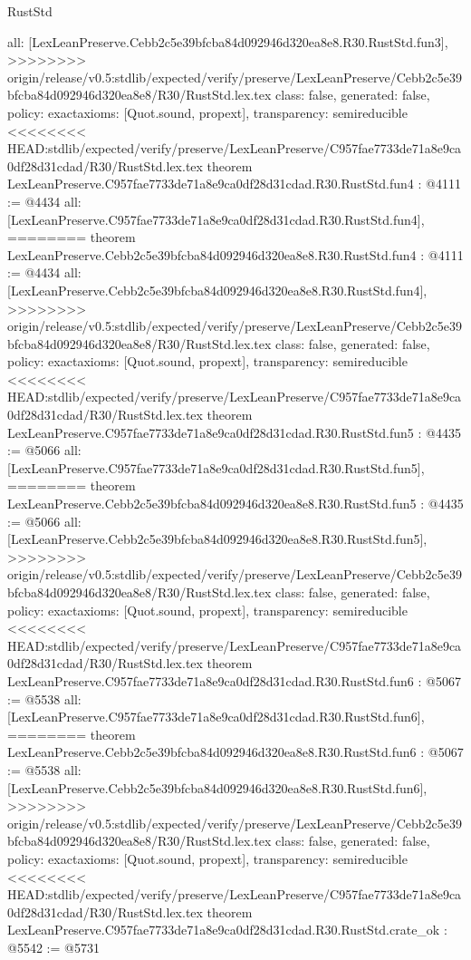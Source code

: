 \begin{lexlean}{RustStd}
\begin{coremodule}
{\begin{coremodule}
{{{{{{{  all: [LexLeanPreserve.Cebb2c5e39bfcba84d092946d320ea8e8.R30.RustStd.fun3],
>>>>>>>> origin/release/v0.5:stdlib/expected/verify/preserve/LexLeanPreserve/Cebb2c5e39bfcba84d092946d320ea8e8/R30/RustStd.lex.tex
  class: false,
  generated: false,
  policy: exact{axioms: [Quot.sound, propext]},
  transparency: semireducible
}
<<<<<<<< HEAD:stdlib/expected/verify/preserve/LexLeanPreserve/C957fae7733de71a8e9ca0df28d31cdad/R30/RustStd.lex.tex
theorem LexLeanPreserve.C957fae7733de71a8e9ca0df28d31cdad.R30.RustStd.fun4 : @4111 := @4434 {
  all: [LexLeanPreserve.C957fae7733de71a8e9ca0df28d31cdad.R30.RustStd.fun4],
========
theorem LexLeanPreserve.Cebb2c5e39bfcba84d092946d320ea8e8.R30.RustStd.fun4 : @4111 := @4434 {
  all: [LexLeanPreserve.Cebb2c5e39bfcba84d092946d320ea8e8.R30.RustStd.fun4],
>>>>>>>> origin/release/v0.5:stdlib/expected/verify/preserve/LexLeanPreserve/Cebb2c5e39bfcba84d092946d320ea8e8/R30/RustStd.lex.tex
  class: false,
  generated: false,
  policy: exact{axioms: [Quot.sound, propext]},
  transparency: semireducible
}
<<<<<<<< HEAD:stdlib/expected/verify/preserve/LexLeanPreserve/C957fae7733de71a8e9ca0df28d31cdad/R30/RustStd.lex.tex
theorem LexLeanPreserve.C957fae7733de71a8e9ca0df28d31cdad.R30.RustStd.fun5 : @4435 := @5066 {
  all: [LexLeanPreserve.C957fae7733de71a8e9ca0df28d31cdad.R30.RustStd.fun5],
========
theorem LexLeanPreserve.Cebb2c5e39bfcba84d092946d320ea8e8.R30.RustStd.fun5 : @4435 := @5066 {
  all: [LexLeanPreserve.Cebb2c5e39bfcba84d092946d320ea8e8.R30.RustStd.fun5],
>>>>>>>> origin/release/v0.5:stdlib/expected/verify/preserve/LexLeanPreserve/Cebb2c5e39bfcba84d092946d320ea8e8/R30/RustStd.lex.tex
  class: false,
  generated: false,
  policy: exact{axioms: [Quot.sound, propext]},
  transparency: semireducible
}
<<<<<<<< HEAD:stdlib/expected/verify/preserve/LexLeanPreserve/C957fae7733de71a8e9ca0df28d31cdad/R30/RustStd.lex.tex
theorem LexLeanPreserve.C957fae7733de71a8e9ca0df28d31cdad.R30.RustStd.fun6 : @5067 := @5538 {
  all: [LexLeanPreserve.C957fae7733de71a8e9ca0df28d31cdad.R30.RustStd.fun6],
========
theorem LexLeanPreserve.Cebb2c5e39bfcba84d092946d320ea8e8.R30.RustStd.fun6 : @5067 := @5538 {
  all: [LexLeanPreserve.Cebb2c5e39bfcba84d092946d320ea8e8.R30.RustStd.fun6],
>>>>>>>> origin/release/v0.5:stdlib/expected/verify/preserve/LexLeanPreserve/Cebb2c5e39bfcba84d092946d320ea8e8/R30/RustStd.lex.tex
  class: false,
  generated: false,
  policy: exact{axioms: [Quot.sound, propext]},
  transparency: semireducible
}
<<<<<<<< HEAD:stdlib/expected/verify/preserve/LexLeanPreserve/C957fae7733de71a8e9ca0df28d31cdad/R30/RustStd.lex.tex
theorem LexLeanPreserve.C957fae7733de71a8e9ca0df28d31cdad.R30.RustStd.crate_ok : @5542 := @5731 {
}}}}}}}}}}
\end{coremodule}}
\end{coremodule}
\end{lexlean}
